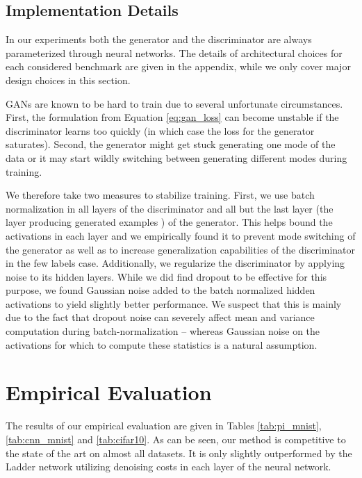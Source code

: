 \documentclass{article} \usepackage{iclr2016_conference,times}
\begin{document}
\subsection{Implementation Details}
In our experiments both the generator and the discriminator are always
parameterized through neural networks. The details of architectural
choices for each considered benchmark are given in the appendix, while
we only cover major design choices in this section. 

GANs are known to be hard to train due to several unfortunate
circumstances. First, the formulation from Equation
\eqref{eq:gan_loss} can become unstable if the discriminator learns
too quickly (in which case the loss for the generator saturates). Second, the
generator might get stuck generating one mode of the
data 
or it may start wildly switching between generating different modes during
training.

We therefore take two measures to stabilize training. First, we use
batch normalization \citep{Ioffe_2015} in all layers of the
discriminator and all but the last layer (the layer producing
generated examples ) of the generator. This helps bound
the activations in each layer and we empirically found it to prevent
mode switching of the generator as well as to increase generalization
capabilities of the discriminator in the few labels
case. Additionally, we regularize the discriminator by applying noise
to its hidden layers. While we did find dropout
\citep{Hinton_arxiv2012} to be effective for this purpose, we found
Gaussian noise added to the batch normalized hidden activations to
yield slightly better performance.
We suspect that this is mainly due to the fact that dropout noise can
severely affect mean and variance computation during
batch-normalization -- whereas Gaussian noise on the activations for
which to compute these statistics is a natural assumption.

\section{Empirical Evaluation}
The results of our empirical evaluation are given in Tables
\ref{tab:pi_mnist}, \ref{tab:cnn_mnist} and \ref{tab:cifar10}. As can
be seen, our method is competitive to the state of the art on almost
all datasets. It is only slightly outperformed by the Ladder network
utilizing denoising costs in each layer of the neural network.
\end{document}
